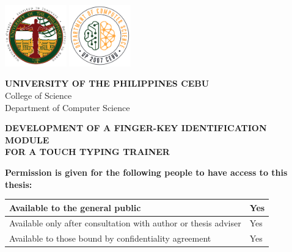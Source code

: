 \documentclass{report}
\begin{document}
\newpage

\begin{center}

	\hspace{0pt}
	\vfill

	\includegraphics[width=0.2\textwidth]{upc.png}
	\includegraphics[width=0.2\textwidth]{dcs.png}
	\par\vspace{0.25cm}

	\textbf{\uppercase{University of the Philippines Cebu}}\\
	College of Science\\
	Department of Computer Science

	\par\vspace{1cm}

	\textbf{\uppercase{Development of a finger-key identification module\\for a touch typing trainer}}

	\par\vspace{1cm}

	\textbf{Permission is given for the following people to have access to this thesis:}

	\par\vspace{0.25cm}

	\begin{tabular}{ | P{0.8\textwidth} | P{0.1\textwidth} | }
		\hline
		Available to the general public                                 & Yes \\
		\hline
		Available only after consultation with author or thesis adviser & Yes \\
		\hline
		Available to those bound by confidentiality agreement           & Yes \\
		\hline
	\end{tabular}
	\par\vspace{1cm}



\end{center}
\end{document}
